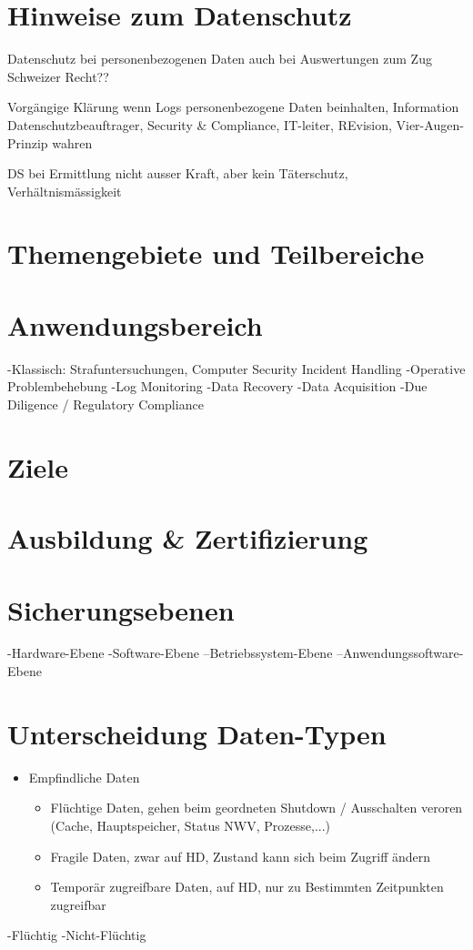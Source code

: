 \section{Hinweise zum Datenschutz}
Datenschutz bei personenbezogenen Daten auch bei Auswertungen zum Zug
Schweizer Recht??

Vorgängige Klärung wenn Logs personenbezogene Daten beinhalten, Information Datenschutzbeauftrager, Security \& Compliance, IT-leiter, REvision, Vier-Augen-Prinzip wahren

DS bei Ermittlung nicht ausser Kraft, aber kein Täterschutz, Verhältnismässigkeit
\section{Themengebiete und Teilbereiche}

\section{Anwendungsbereich}

-Klassisch: Strafuntersuchungen, Computer Security Incident Handling
-Operative Problembehebung
-Log Monitoring
-Data Recovery
-Data Acquisition
-Due Diligence / Regulatory Compliance

\section{Ziele}

\section{Ausbildung \& Zertifizierung}


\section{Sicherungsebenen}
-Hardware-Ebene
-Software-Ebene
--Betriebssystem-Ebene
--Anwendungssoftware-Ebene

\section{Unterscheidung Daten-Typen}
\begin{itemize}
\item Empfindliche Daten
\begin{itemize}
\item Flüchtige Daten, gehen beim geordneten Shutdown / Ausschalten veroren (Cache, Hauptspeicher, Status NWV, Prozesse,...)
\item Fragile Daten, zwar auf HD, Zustand kann sich beim Zugriff ändern
\item Temporär zugreifbare Daten, auf HD, nur zu Bestimmten Zeitpunkten zugreifbar
\end{itemize}
\end{itemize}
-Flüchtig
-Nicht-Flüchtig

